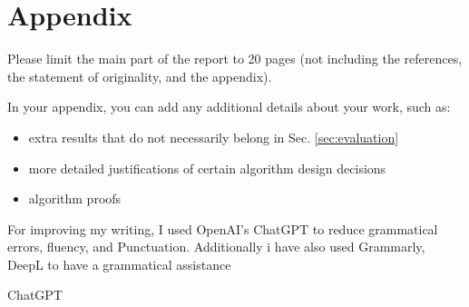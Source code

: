 \documentclass[../report.tex]{subfiles}
\begin{document}
    \section*{Appendix}
    \label{sec:appendix}

    Please limit the main part of the report to 20 pages (not including the references, the statement of originality, and the appendix).

    In your appendix, you can add any additional details about your work, such as:
    \begin{itemize}
        \item extra results that do not necessarily belong in Sec. \ref{sec:evaluation}
        \item more detailed justifications of certain algorithm design decisions
        \item algorithm proofs
    \end{itemize}
    For improving my writing, I used OpenAI's ChatGPT to reduce grammatical errors, fluency, and Punctuation.
    Additionally i have also used Grammarly, DeepL to have a grammatical assistance
    \item ChatGPT
    \
\end{document}
